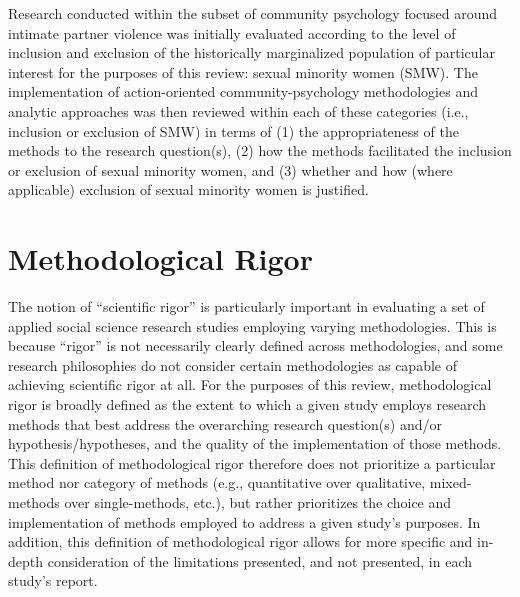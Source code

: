 \documentclass[11pt,]{tufte-book}
\begin{document}
Research conducted within the subset of community psychology focused
around intimate partner violence was initially evaluated according to
the level of inclusion and exclusion of the historically marginalized
population of particular interest for the purposes of this review:
sexual minority women (SMW). The implementation of action-oriented
community-psychology methodologies and analytic approaches was then
reviewed within each of these categories (i.e., inclusion or exclusion
of SMW) in terms of (1) the appropriateness of the methods to the
research question(s), (2) how the methods facilitated the inclusion or
exclusion of sexual minority women, and (3) whether and how (where
applicable) exclusion of sexual minority women is justified.

\section{Methodological Rigor}\label{methodological-rigor}

The notion of ``scientific rigor'' is particularly important in
evaluating a set of applied social science research studies employing
varying methodologies. This is because ``rigor'' is not necessarily
clearly defined across methodologies, and some research philosophies do
not consider certain methodologies as capable of achieving scientific
rigor at all. For the purposes of this review, methodological rigor is
broadly defined as the extent to which a given study employs research
methods that best address the overarching research question(s) and/or
hypothesis/hypotheses, and the quality of the implementation of those
methods. This definition of methodological rigor therefore does not
prioritize a particular method nor category of methods (e.g.,
quantitative over qualitative, mixed-methods over single-methods, etc.),
but rather prioritizes the choice and implementation of methods employed
to address a given study's purposes. In addition, this definition of
methodological rigor allows for more specific and in-depth consideration
of the limitations presented, and not presented, in each study's report.
\end{document}
